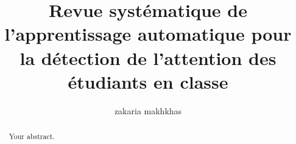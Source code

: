 \documentclass[a4paper,12pt]{article}
\title{Revue systématique de l'apprentissage automatique pour la détection de l'attention des étudiants en classe}
\author{zakaria makhkhas}
\begin{document}
\maketitle

\begin{abstract}
Your abstract.
\end{abstract}










\end{document}
